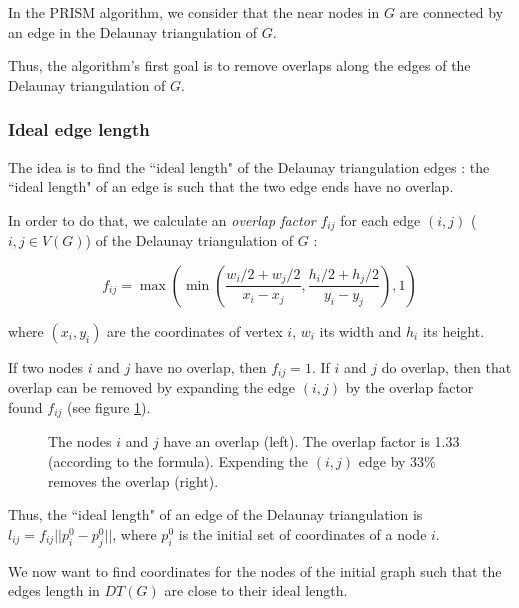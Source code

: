 \documentclass[12pt]{report}
\begin{document}
In the PRISM algorithm, we consider that the near nodes in $G$ are connected by an edge in the Delaunay triangulation of $G$.

Thus, the algorithm's first goal is to remove overlaps along the edges of the Delaunay triangulation of $G$.

\subsubsection{Ideal edge length}
The idea is to find the ``ideal length" of the Delaunay triangulation edges : the ``ideal length" of an edge is such that the two edge ends have no overlap.

\bigskip
In order to do that, we calculate an \emph{overlap factor} $f_{ij}$ for each edge $(i,j)$ ($i,j \in V(G)$) of the Delaunay triangulation of $G$ :

\[ f_{ij} = \max \left( \min \left(\frac{w_i/2 + w_j/2}{x_i - x_j}, 
\frac{h_i/2 + h_j/2}{y_i - y_j} \right), 1 \right) \label{of}\]

where $(x_i,y_i)$ are the coordinates of vertex $i$, $w_i$ its width and $h_i$ its height.

If two nodes $i$ and $j$ have no overlap, then $f_{ij} = 1$. 
If $i$ and $j$ do overlap, then that overlap can be removed by expanding the edge $(i,j)$ by the overlap factor found $f_{ij}$ (see figure \ref{overlapFactor}). 

\begin{figure}[h]
	\center
  \setlength\fboxsep{5pt}
  \setlength\fboxrule{0.5pt}
  \caption{The nodes $i$ and $j$ have an overlap (left). The overlap factor is 1.33 (according to the formula). Expending the $(i,j)$ edge by $33 \%$ removes the overlap (right).}
  \label{overlapFactor}
\end{figure}

Thus, the ``ideal length" of an edge of the Delaunay triangulation is $l_{ij} = f_{ij}||p_i^0 - p_j^0||$, where $p_i^0$ is the initial set of coordinates of a node $i$.

We now want to find coordinates for the nodes of the initial graph such that the edges length in $DT(G)$ are close to their ideal length.
\end{document}
